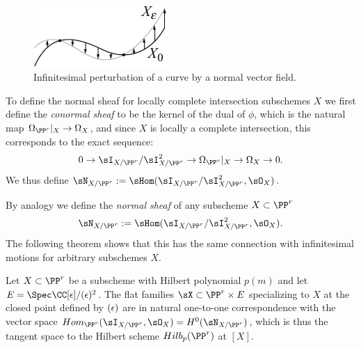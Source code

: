\begin{figure}
\inprogress 
\centerline {\includegraphics[width=2in]{"main/Fig06-0"}}
 \caption{Infinitesimal perturbation of a curve by a normal vector field.}
\end{figure}

To define the normal sheaf for locally complete intersection subschemes $X$ we first define the \emph{conormal sheaf}
to be the kernel of the dual  of $\phi$, which is the natural map $\Omega_{\PP^r}|_X \to \Omega_X$,
and since $X$ is locally a complete intersection, this corresponds to the exact sequence:
$$
0\to \sI_{X/\PP^r}/\sI_{X/\PP^r}^2 \to \Omega_{\PP^r}|_X \to \Omega_X \to 0.
$$
We thus define $\sN_{X/\PP^r} := \sHom(\sI_{X/\PP^r}/\sI_{X/\PP^r}^2, \sO_X)$.

By analogy we define the \emph{normal sheaf} of any subscheme $X\subset \PP^r$
$$
\sN_{X/\PP^r} := \sHom(\sI_{X/\PP^r}/\sI_{X/\PP^r}^2, \sO_X).
$$
The following theorem shows that this
has the same connection with infinitesimal motions for arbitrary subschemes $X$.


\begin{theorem}\label{tangent space of Hilb}
Let $X\subset \PP^r$ be a subscheme with Hilbert polynomial $p(m)$ and let
$E = \Spec\CC[\eps]/(\eps)^{2}$. The flat families 
$\sX \subset \PP^r\times E$ specializing to $X$ at the closed point defined by $(\eps)$
are in natural one-to-one correspondence with the vector space $Hom_{\PP^r}(\sI_{X/\PP^r}, \sO_X) = H^0(\sN_{X/\PP^r})$, which is thus the tangent space to the Hilbert scheme $Hilb_{p}(\PP^r)$ at $[X]$.
\end{theorem}

